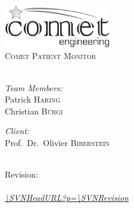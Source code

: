 % 
% 
% 
%
%
% 
%

\begin{titlepage}

\begin{center}

\includegraphics[width=0.35\textwidth]{./comet-logo.eps}\\[2.5cm]    

\textsc{\Large Comet Patient Monitor}\\[2cm]

{ \huge \bfseries \doctitle{}}\\[3cm]

\begin{minipage}{0.45\textwidth}
\begin{flushleft} \large
\emph{Team Members:}\\
Patrick \textsc{Haring}\\
Christian \textsc{Bürgi}
\end{flushleft}
\end{minipage}
\begin{minipage}{0.45\textwidth}
\begin{flushright} \large
\emph{Client:} \\
Prof.~Dr.~Olivier \textsc{Biberstein}\\
~
\end{flushright}
\end{minipage}

\vfill

{\large 
Revision: \SVNRevision \\[0.2cm]
\SVNDate \\[0.2cm]
{\footnotesize \itshape \url{\SVNHeadURL?p=\SVNRevision}}}

\end{center}

\end{titlepage}